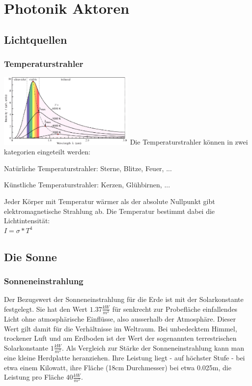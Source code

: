 \section{Photonik Aktoren}
\subsection{Lichtquellen}
\subsubsection{Temperaturstrahler}
\begin{multicols}{2}
    \includegraphics[width=0.5\textwidth]{images/temperaturstrahler} \vfill \columnbreak
    Die Temperaturstrahler können in zwei kategorien eingeteilt werden:
    \begin{compactitem}
        \item Natürliche Temperaturstrahler: Sterne, Blitze, Feuer, ...
        \item Künstliche Temperaturstrahler: Kerzen, Glühbirnen, ... 
    \end{compactitem}
    Jeder Körper mit Temperatur wärmer als der absolute Nullpunkt gibt elektromagnetische Strahlung ab.
    Die Temperatur bestimmt dabei die Lichtintensität: \\ $I=\sigma*T^4$
\end{multicols}

\subsection{Die Sonne}
\subsubsection{Sonneneinstrahlung}
Der Bezugswert der Sonneneinstrahlung für die Erde ist mit der Solarkonstante festgelegt. Sie hat den Wert $1.37 \frac{kW}{m^2}$ für senkrecht zur Probefläche einfallendes Licht ohne atmosphärische Einflüsse, also ausserhalb der Atmosphäre. Dieser Wert gilt damit für die Verhältnisse im Weltraum. Bei unbedecktem Himmel, trockener Luft und am Erdboden ist der Wert der sogenannten terrestrischen Solarkonstante $1 \frac{kW}{m^2}$. Als Vergleich zur Stärke der Sonneneinstrahlung kann man eine kleine Herdplatte heranziehen. Ihre Leistung liegt - auf höchster Stufe - bei etwa einem Kilowatt, ihre Fläche (18cm Durchmesser) bei etwa 0.025m, die Leistung pro Fläche $40 \frac{kW}{m^2}$.

